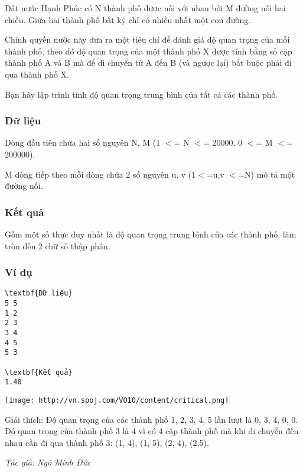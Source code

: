 

Đất nước Hạnh Phúc có N thành phố được nối với nhau bởi M đường nối hai chiều. Giữa hai thành phố bất kỳ chỉ có nhiều nhất một con đường.

Chính quyền nước này đưa ra một tiêu chí để đánh giá độ quan trọng của mỗi thành phố, theo đó độ quan trọng của một thành phố X được tính bằng số cặp thành phố A và B mà để di chuyển từ A đến B (và ngược lại) bắt buộc phải đi qua thành phố X.

Bạn hãy lập trình tính độ quan trọng trung bình của tất cả các thành phố.

\subsubsection{Dữ liệu}

Dòng đầu tiên chứa hai số nguyên N, M (1 $<$= N $<$= 20000, 0 $<$= M $<$= 200000).

M dòng tiếp theo mỗi dòng chứa 2 số nguyên u, v (1$<$=u,v $<$=N) mô tả một đường nối.

\subsubsection{Kết quả}

Gồm một số thực duy nhất là độ quan trọng trung bình của các thành phố, làm tròn đến 2 chữ số thập phân.

\subsubsection{Ví dụ}
\begin{verbatim}
\textbf{Dữ liệu}
5 5
1 2
2 3
3 4
4 5
5 3

\textbf{Kết quả}
1.40

\end{verbatim}


\texttt{[image: http://vn.spoj.com/VO10/content/critical.png]}

Giải thích: Độ quan trọng của các thành phố 1, 2, 3, 4, 5 lần lượt là 0, 3, 4, 0, 0. Độ quan trọng của thành phố 3 là 4 vì có 4 cặp thành phố mà khi di chuyển đến nhau cần đi qua thành phố 3: (1, 4), (1, 5), (2, 4), (2,5).

\emph{Tác giả: Ngô Minh Đức }